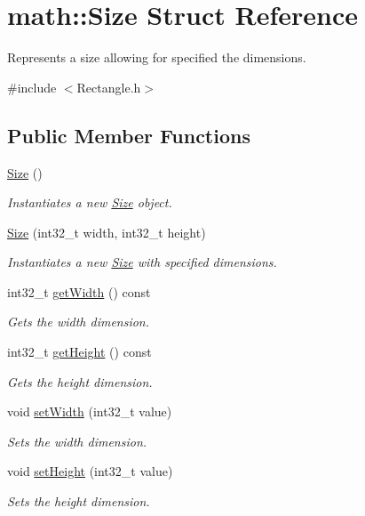 \hypertarget{structmath_1_1_size}{}\section{math\+::Size Struct Reference}
\label{structmath_1_1_size}


Represents a size allowing for specified the dimensions.  




{\ttfamily \#include $<$Rectangle.\+h$>$}

\subsection*{Public Member Functions}
\begin{DoxyCompactItemize}
\item 
\mbox{\hyperlink{structmath_1_1_size_a3978b8ec6dc40374fa15eacab6e6974f}{Size}} ()
\begin{DoxyCompactList}\small\item\em Instantiates a new \mbox{\hyperlink{structmath_1_1_size}{Size}} object. \end{DoxyCompactList}\item 
\mbox{\hyperlink{structmath_1_1_size_a60b16ee3df2a6dc3222555e649579eff}{Size}} (int32\+\_\+t width, int32\+\_\+t height)
\begin{DoxyCompactList}\small\item\em Instantiates a new \mbox{\hyperlink{structmath_1_1_size}{Size}} with specified dimensions. \end{DoxyCompactList}\item 
int32\+\_\+t \mbox{\hyperlink{structmath_1_1_size_a50f846ffa0f6fc66153d49205447727c}{get\+Width}} () const
\begin{DoxyCompactList}\small\item\em Gets the width dimension. \end{DoxyCompactList}\item 
int32\+\_\+t \mbox{\hyperlink{structmath_1_1_size_a706771feb56c568079f774e0afb3859f}{get\+Height}} () const
\begin{DoxyCompactList}\small\item\em Gets the height dimension. \end{DoxyCompactList}\item 
void \mbox{\hyperlink{structmath_1_1_size_a35d3e4657cee6ddb1526242a32e0cab7}{set\+Width}} (int32\+\_\+t value)
\begin{DoxyCompactList}\small\item\em Sets the width dimension. \end{DoxyCompactList}\item 
void \mbox{\hyperlink{structmath_1_1_size_a1a15360158e65dd785e712d4969d5eb2}{set\+Height}} (int32\+\_\+t value)
\begin{DoxyCompactList}\small\item\em Sets the height dimension. \end{DoxyCompactList}\end{DoxyCompactItemize}


